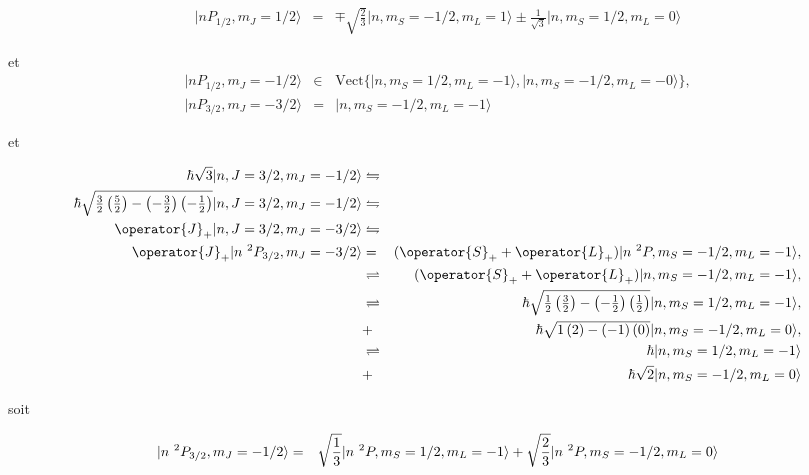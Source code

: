 \begin{eqnarray}
	\vert nP_{1/2}  , m_J = 1/2  \rangle & = & \mp \sqrt{\frac{2}{3}} \vert n , m_S=-1/2  , m_L=1 \rangle \pm \frac{1}{\sqrt{3} }   \vert n , m_S=1/2  , m_L=0 \rangle		
\end{eqnarray}

et 
\begin{eqnarray}
	\vert nP_{1/2}  , m_J = -1/2   \rangle  & \in & 	\mathrm{Vect} \{ \vert n , m_S = 1/2  , m_L = -1  \rangle , \vert n , m_S = -1/2  , m_L = -0  \rangle  \} ,\\
	\vert nP_{3/2}  , m_J = -3/2   \rangle & = & \vert n , m_S = -1/2  , m_L = -1  \rangle		
\end{eqnarray}


et 

\begin{eqnarray}
	\hbar \sqrt{3} \vert n , J = 3/2  , m_J = -1/2 \rangle & \leftrightharpoons & \notag \\
	\hbar {\textstyle \sqrt{\frac{3}{2} \left ( \frac{5}2 \right ) -  \left ( -\frac{3}{2} \right ) \left ( -\frac{1}{2} \right )}} \vert n , J = 3/2  , m_J = -1/2 \rangle & \leftrightharpoons & \notag \\
	\operator{J}_+ \vert n , J = 3/2  , m_J = -3/2 \rangle & \leftrightharpoons & \notag \\
	\operator{J}_+ \vert n {~}^2P_{3/2}  , m_J = -3/2 \rangle & = & (\operator{S}_+ + \operator{L}_+)	\vert n {~}^2 P , m_S = -1/2  , m_L = -1  \rangle, \notag\\
	& \rightleftharpoons &	(\operator{S}_+ + \operator{L}_+)	\vert n , m_S = -1/2  , m_L = -1  \rangle, \notag\\
	& \rightleftharpoons &	\hbar 	{\textstyle \sqrt{\frac{1}{2} \left ( \frac{3}2 \right ) -  \left ( -\frac{1}{2} \right ) \left ( \frac{1}{2} \right )}}\vert n , m_S = 1/2  , m_L = -1  \rangle, \notag\\
	& + & \hbar 	{\textstyle \sqrt{1 \left ( 2 \right ) -  \left ( -1 \right ) \left ( 0 \right )}}\vert n , m_S = -1/2  , m_L = 0  \rangle, \notag\\
	& \rightleftharpoons & \hbar \vert n , m_S = 1/2  , m_L = -1  \rangle \notag \\
	& + & \hbar \sqrt{2}\vert n , m_S = -1/2  , m_L = 0  \rangle \notag 
\end{eqnarray}

soit 

\begin{eqnarray}
	\vert n {~}^2P_{3/2}  , m_J = -1/2 \rangle	 & = & 	 \sqrt{\frac{1}{3} }\vert n {~}^2P  , m_S = 1/2  , m_L = -1 \rangle + \sqrt{\frac{2}{3} }\vert n {~}^2P  , m_S =-1/2  , m_L = 0 \rangle \notag
\end{eqnarray}

